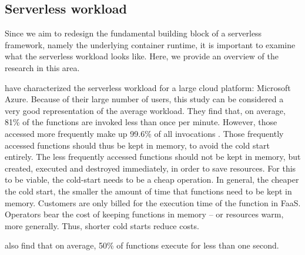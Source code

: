 \subsection{Serverless workload}
\label{section:serverless_workload}

Since we aim to redesign the fundamental building block of a serverless framework, namely the underlying container runtime, it is important to examine what the serverless workload looks like. Here, we provide an overview of the research in this area.

\citeauthor{Shahrad2020} have characterized the serverless workload for a large cloud platform: Microsoft Azure. Because of their large number of users, this study can be considered a very good representation of the average workload.
They find that, on average, 81\% of the functions are invoked less than once per minute. However, those accessed more frequently make up 99.6\% of all invocations \cite{Shahrad2020}.
Those frequently accessed functions should thus be kept in memory, to avoid the cold start entirely. The less frequently accessed functions should not be kept in memory, but created, executed and destroyed immediately, in order to save resources. For this to be viable, the cold-start needs to be a cheap operation. In general, the cheaper the cold start, the smaller the amount of time that functions need to be kept in memory.
Customers are only billed for the execution time of the function in FaaS. Operators bear the cost of keeping functions in memory -- or resources warm, more generally. Thus, shorter cold starts reduce costs.

\citeauthor{Shahrad2020} also find that on average, 50\% of functions execute for less than one second.

\begin{quote}
\end{quote}

